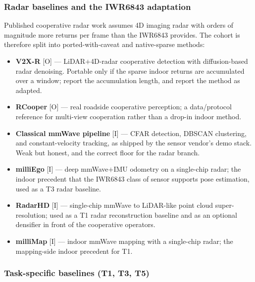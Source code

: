 \subsubsection{Radar baselines and the IWR6843 adaptation}
\label{sec:bench:radar}
Published cooperative radar work assumes 4D imaging radar with orders of
magnitude more returns per frame than the IWR6843 provides. The cohort is
therefore split into ported-with-caveat and native-sparse methods:
\begin{itemize}
  \item \textbf{V2X-R} \cite{v2xr} [O] --- LiDAR${+}$4D-radar cooperative
        detection with diffusion-based radar denoising. Portable only if the
        sparse indoor returns are accumulated over a window; report the
        accumulation length, and report the method as adapted.
  \item \textbf{RCooper} \cite{rcooper} [O] --- real roadside cooperative
        perception; a data/protocol reference for multi-view cooperation rather
        than a drop-in indoor method.
  \item \textbf{Classical mmWave pipeline} [I] --- CFAR detection, DBSCAN
        clustering, and constant-velocity tracking, as shipped by the sensor
        vendor's demo stack. Weak but honest, and the correct floor for the
        radar branch.
  \item \textbf{milliEgo} \cite{milliego} [I] --- deep mmWave${+}$IMU odometry
        on a single-chip radar; the indoor precedent that the IWR6843 class of
        sensor supports pose estimation, used as a T3 radar baseline.
  \item \textbf{RadarHD} \cite{radarhd} [I] --- single-chip mmWave to
        LiDAR-like point cloud super-resolution; used as a T1 radar
        reconstruction baseline and as an optional densifier in front of the
        cooperative operators.
  \item \textbf{milliMap} \cite{millimap} [I] --- indoor mmWave mapping with a
        single-chip radar; the mapping-side indoor precedent for T1.
\end{itemize}

\subsubsection{Task-specific baselines (T1, T3, T5)}
\label{sec:bench:taskspecific}


